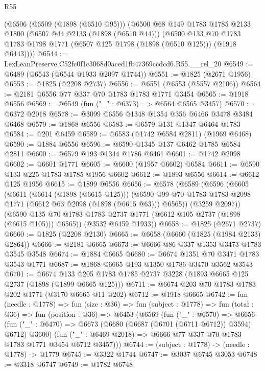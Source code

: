 \begin{lexlean}{R55}
\begin{coremodule}
    (@6506
      (@6509 (@1898 (@6510 @95)))
      (@6500
        @68
        @149
        @1783
        @1785
        @2133
        @1800
        (@6507 @44 @2133 (@1898 (@6510 @44)))
        (@6500
          @133
          @70
          @1783
          @1783
          @1798
          @1771
          (@6507 @125 @1798 (@1898 (@6510 @125)))
          (@1918 @6443))))
@6544 := LexLeanPreserve.C52fc0f1c3068d0aced1fb47369ccdcd6.R55.__rel_20
@6549 := @6489 (@6543 (@6544 @1933 @2097 @1744))
@6551 := @1825 (@2671 @1956)
@6553 := @1825 (@2208 @2737)
@6556 := @6551 (@6553 (@5557 @2106))
@6564 := @2181 @6556 @77 @337 @70 @1783 @1783 @1771 @3454
@6565 := @1918 @6556
@6569 := @6549 (fun ("_" : @6373) => @6564 @6565 @3457)
@6570 := @6372 @2018
@6578 := @3099 @6556 @1348 @1354 @356 @6466 @3478 @3484 @6468
@6579 := @1868 @6556
@6583 := @6579 @131 @1347 @6464 @1783
@6584 := @201 @6459
@6589 := @6583 (@1742 @6584 @2811) (@1969 @6468)
@6590 := @1884 @6556
@6596 := @6590 @1345 @137 @6462 @1785 @6584 @2811
@6600 := @6579 @193 @1344 @1786 @6461
@6601 := @1742 @2098
@6602 := @6601 @1771
@6605 := @6600 (@1957 @6602) @6584
@6611 := @6590 @133 @225 @1783 @1785 @1956 @6602
@6612 := @1893 @6556
@6614 := @6612 @125 @1956
@6615 := @1899 @6556
@6656 := @6578
    (@6589
      (@6596
        (@6605
          (@6611
            (@6614 (@1898 (@6615 @125)))
            (@6590 @99 @70 @1783 @1783 @2098 @1771 (@6612 @63 @2098 (@1898 (@6615 @63))) @6565))
          (@3259 @2097))
        (@6590 @135 @70 @1783 @1783 @2737 @1771 (@6612 @105 @2737 (@1898 (@6615 @105))) @6565))
      (@3532 @6459 @1933))
@6658 := @1825 (@2671 @2737)
@6660 := @1825 (@2208 @2130)
@6665 := @6658 (@6660 (@1825 (@1984 @2133) @2864))
@6666 := @2181 @6665
@6673 := @6666 @86 @337 @1353 @3473 @1783 @3545 @3548
@6674 := @1884 @6665
@6680 := @6674 @1351 @70 @3471 @1783 @3543 @1771
@6687 := @1868 @6665 @193 @1350 @1786 @3470 @3562 @3543
@6701 := @6674 @133 @205 @1783 @1785 @2737 @3228 (@1893 @6665 @125 @2737 (@1898 (@1899 @6665 @125)))
@6711 := @6674 @203 @70 @1783 @1783 @202 @1771 (@3170 @6665 @11 @202)
@6712 := @1918 @6665
@6742 := fun (needle : @1778) =>
  fun (size : @36) =>
  fun (subject : @1778) =>
  fun (total : @36) =>
  fun (position : @36) =>
  @6453
    (@6569
      (fun ("_" : @6570) =>
      @6656
        (fun ("_" : @6470) => @6673 (@6680 (@6687 (@6701 (@6711 @6712)) @3594) @6712) @3600)
        (fun ("_" : @6469 @2018) => @6666 @77 @337 @70 @1783 @1783 @1771 @3454 @6712 @3457)))
@6744 := (subject : @1778) -> (needle : @1778) -> @1779
@6745 := @3322 @1744
@6747 := @3037 @6745 @3053
@6748 := @3318 @6747
@6749 := @1782 @6748

\end{coremodule}
\end{lexlean}
